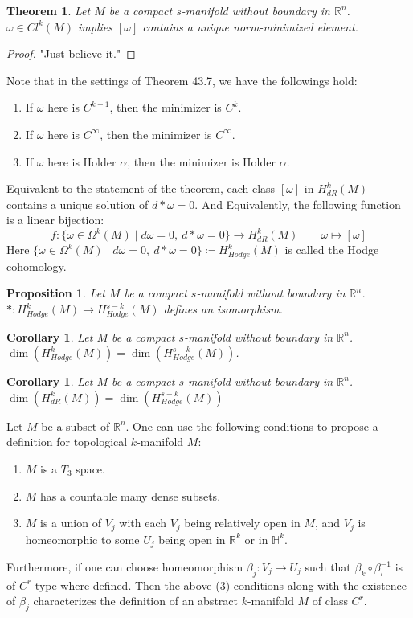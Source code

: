 \documentclass[11pt,oneside]{book}
\theoremstyle{break}
\theoremstyle{break}
\newtheorem{thm}{Theorem}[section]
\newtheorem{prop}[lem]{Proposition}
\newtheorem{corT}[lem]{Corollary}
\newcommand{\R}{\mathbb{R}}
\begin{document}
\begin{thm}
Let $M$ be a compact $s$-manifold without boundary in $\R^n$. \\$\omega \in Cl^k(M)$ implies $[\omega]$ contains a unique norm-minimized element.
\end{thm}
\begin{proof}
"Just believe it."
\end{proof}
Note that in the settings of Theorem 43.7, we have the followings hold:
\begin{enumerate}[topsep=3pt,itemsep=-1ex,partopsep=1ex,parsep=1ex]
\item If $\omega$ here is $C^{k+1}$, then the minimizer is $C^k$.
\item If $\omega$ here is $C^{\infty}$, then the minimizer is $C^\infty$.
\item If $\omega$ here is Holder $\alpha$, then the minimizer is Holder $\alpha$.
\end{enumerate}
Equivalent to the statement of the theorem, each class $[\omega]$ in $H^k_{dR}(M)$ contains a unique solution of $d*\omega = 0$. And Equivalently, the following function is a linear bijection: 
$$f:\{ \omega \in \Omega^k(M)\mid d\omega = 0 , \ d*\omega = 0\} \to H_{dR}^k(M) \qquad \omega\mapsto [\omega]$$ 
Here $\{ \omega \in \Omega^k(M)\mid d\omega = 0 , \ d*\omega = 0\}  \coloneqq H_{Hodge}^k(M)$ is called the Hodge cohomology. \\

\begin{prop}
Let $M$ be a compact $s$-manifold without boundary in $\R^n$.\\
$*:H_{Hodge}^k(M) \to H_{Hodge}^{s-k}(M)$ defines an isomorphism.
\end{prop}

\begin{corT}
Let $M$ be a compact $s$-manifold without boundary in $\R^n$.
$\dim(H_{Hodge}^k(M)) = \dim(H_{Hodge}^{s-k}(M))$.
\end{corT}

\begin{corT}
Let $M$ be a compact $s$-manifold without boundary in $\R^n$. $\dim(H_{dR}^k(M)) = \dim(H_{Hodge}^{s-k}(M))$
\end{corT}

Let $M$ be a subset of $\R^n$. One can use the following conditions to propose a definition for topological $k$-manifold $M$:
\begin{enumerate}[topsep=3pt,itemsep=-1ex,partopsep=1ex,parsep=1ex]
\item $M$ is a $T_3$ space. 
\item $M$ has a countable many dense subsets.
\item $M$ is a union of $V_j$ with each $V_j$ being relatively open in $M$, and $V_j$ is homeomorphic to some $U_j$ being open in $\R^k$ or in $\mathbb{H}^k$.  
\end{enumerate} 
Furthermore, if one can choose homeomorphism $\beta_j: V_j \to U_j$ such that $\beta_k \circ \beta_l^{-1}$ is of $C^r$ type where defined. Then the above (3) conditions along with the existence of $\beta_j$ characterizes the definition of an abstract $k$-manifold $M$ of class $C^r$.
\end{document}
